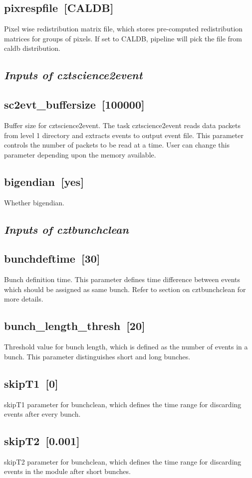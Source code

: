 \documentclass[11pt,oneside,a4paper]{article}
\begin{document}
\subsection*{pixrespfile~[CALDB]}
    Pixel wise redistribution matrix file, which stores pre-computed redistribution 
matrices for groups of pixels. If set 
to CALDB, pipeline will pick the file from caldb distribution.
\subsection*{\emph{Inputs of cztscience2event}}
    
\subsection*{sc2evt\_buffersize~[100000]}
    Buffer size for cztscience2event. The task cztscience2event reads 
data packets from level 1 directory and extracts events to output event file. 
This parameter controls the number of packets to be read at a time. User 
can change this parameter depending upon the memory available.
\subsection*{bigendian~[yes]}
    Whether bigendian. 
\subsection*{\emph{Inputs of cztbunchclean}}

\subsection*{bunchdeftime~[30]}
    Bunch definition time. This parameter defines time difference between 
events which should be assigned as same bunch. Refer to section on cztbunchclean 
for more details.
\subsection*{bunch\_length\_thresh~[20]}
    Threshold value for bunch length, which is defined as  the number of events in a bunch. 
This parameter distinguishes short and long bunches.
\subsection*{skipT1~[0]}
    skipT1 parameter for bunchclean, which defines the time range for 
discarding events after every bunch.
\subsection*{skipT2~[0.001]}
    skipT2 parameter for bunchclean, which defines the time range for 
discarding events in the module after short bunches.
\end{document}
